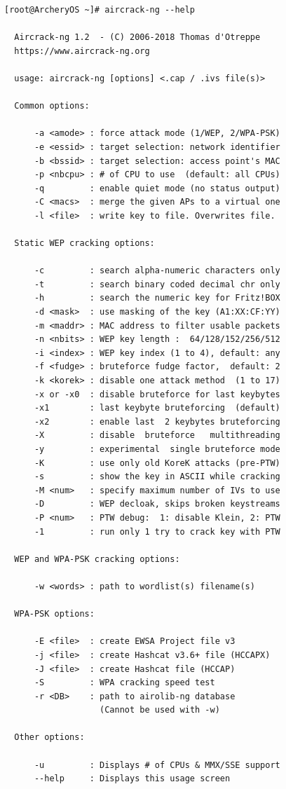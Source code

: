\documentclass{article}
\begin{document}
\begin{lstlisting}
[root@ArcheryOS ~]# aircrack-ng --help

  Aircrack-ng 1.2  - (C) 2006-2018 Thomas d'Otreppe
  https://www.aircrack-ng.org

  usage: aircrack-ng [options] <.cap / .ivs file(s)>

  Common options:

      -a <amode> : force attack mode (1/WEP, 2/WPA-PSK)
      -e <essid> : target selection: network identifier
      -b <bssid> : target selection: access point's MAC
      -p <nbcpu> : # of CPU to use  (default: all CPUs)
      -q         : enable quiet mode (no status output)
      -C <macs>  : merge the given APs to a virtual one
      -l <file>  : write key to file. Overwrites file.

  Static WEP cracking options:

      -c         : search alpha-numeric characters only
      -t         : search binary coded decimal chr only
      -h         : search the numeric key for Fritz!BOX
      -d <mask>  : use masking of the key (A1:XX:CF:YY)
      -m <maddr> : MAC address to filter usable packets
      -n <nbits> : WEP key length :  64/128/152/256/512
      -i <index> : WEP key index (1 to 4), default: any
      -f <fudge> : bruteforce fudge factor,  default: 2
      -k <korek> : disable one attack method  (1 to 17)
      -x or -x0  : disable bruteforce for last keybytes
      -x1        : last keybyte bruteforcing  (default)
      -x2        : enable last  2 keybytes bruteforcing
      -X         : disable  bruteforce   multithreading
      -y         : experimental  single bruteforce mode
      -K         : use only old KoreK attacks (pre-PTW)
      -s         : show the key in ASCII while cracking
      -M <num>   : specify maximum number of IVs to use
      -D         : WEP decloak, skips broken keystreams
      -P <num>   : PTW debug:  1: disable Klein, 2: PTW
      -1         : run only 1 try to crack key with PTW

  WEP and WPA-PSK cracking options:

      -w <words> : path to wordlist(s) filename(s)

  WPA-PSK options:

      -E <file>  : create EWSA Project file v3
      -j <file>  : create Hashcat v3.6+ file (HCCAPX)
      -J <file>  : create Hashcat file (HCCAP)
      -S         : WPA cracking speed test
      -r <DB>    : path to airolib-ng database
                   (Cannot be used with -w)

  Other options:

      -u         : Displays # of CPUs & MMX/SSE support
      --help     : Displays this usage screen
\end{lstlisting}
\end{document}
